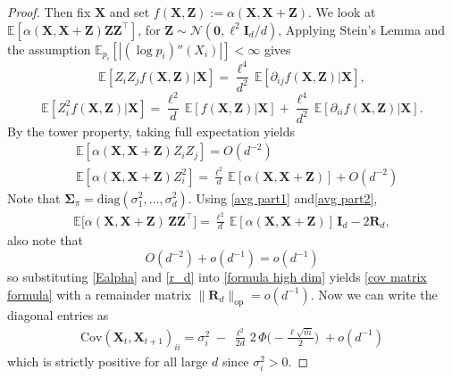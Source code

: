 \documentclass[conference]{IEEEtran}
\theoremstyle{definition}
\begin{document}
\begin{proof}
Then fix \(\boldsymbol{X}\) and set $f(\boldsymbol{X,Z}):=\alpha(\boldsymbol{X},\boldsymbol{X}+\boldsymbol{Z})$. We look at \(\mathbb{E}[\alpha(\boldsymbol{X},\boldsymbol{X}+\boldsymbol{Z}) \boldsymbol{Z}\boldsymbol{Z}^\top]\), for $\boldsymbol{Z}\sim\mathcal N(\boldsymbol0,\ell^2 \boldsymbol{I}_d/d)$,
Applying Stein's Lemma \cite{stein} and the assumption \(\mathbb{E}_{p_i}[|(\log p_i)''(X_i)|] < \infty\) gives
\[
\mathbb{E}[Z_i Z_j f(\boldsymbol{X,Z})| \boldsymbol{X}]
=\frac{\ell^4}{d^2}\,\mathbb{E}[\partial_{ij} f(\boldsymbol{X,Z})| \boldsymbol{X}],
\]
\[
\mathbb{E}[Z_i^2 f(\boldsymbol{X,Z})| \boldsymbol{X}]
=\frac{\ell^2}{d}\,\mathbb{E}[f(\boldsymbol{X,Z})| \boldsymbol{X}]+\frac{\ell^4}{d^2}\,\mathbb{E}[\partial_{ii} f(\boldsymbol{X,Z})|\boldsymbol{X} ].
\]
By the tower property, taking full expectation yields
\begin{align}
&\mathbb{E}[\alpha(\boldsymbol{X},\boldsymbol{X}+\boldsymbol{Z}) Z_i Z_j]=O(d^{-2})\label{avg part1}\\
&\mathbb{E}[\alpha(\boldsymbol{X},\boldsymbol{X}+\boldsymbol{Z}) Z_i^2]=\frac{\ell^2}{d}\,\mathbb{E}[\alpha(\boldsymbol{X},\boldsymbol{X}+\boldsymbol{Z})]+O(d^{-2})\label{avg part2}
\end{align}
Note that $\boldsymbol\Sigma_{\pi}=\mathrm{diag}(\sigma_1^2,\dots,\sigma_d^2)$. Using \eqref{avg part1} and\eqref{avg part2},
\begin{align}\label{r_d}
\mathbb{E}\big[\alpha(\boldsymbol X,\boldsymbol X+\boldsymbol Z)\,\boldsymbol Z\boldsymbol Z^\top\big]
=\frac{\ell^2}{d}\,\mathbb{E}[\alpha(\boldsymbol X,\boldsymbol X+\boldsymbol Z)]\,\boldsymbol I_d -2\boldsymbol{R}_d,
\end{align}
also note that 
\[O(d^{-2})+o(d^{-1})=o(d^{-1})\]
so substituting \eqref{Ealpha} and \eqref{r_d} into \eqref{formula high dim} yields \eqref{cov matrix formula} with a remainder matrix
$\|\boldsymbol R_d\|_{\mathrm{op}}=o(d^{-1})$. Now we can write the diagonal entries as
\begin{align}\label{diagonal entries}
\mathrm{Cov}(\boldsymbol{X}_t,\boldsymbol{X}_{t+1})_{ii}
= \sigma_i^2 \;-\; \frac{\ell^2}{2d}\,2\,\Phi\!\Big(-\tfrac{\ell\sqrt{\bar m}}{2}\Big)\;+o(d^{-1})
\end{align}
which is strictly positive for all large $d$ since $\sigma_i^2>0$.


\end{proof}
\end{document}
